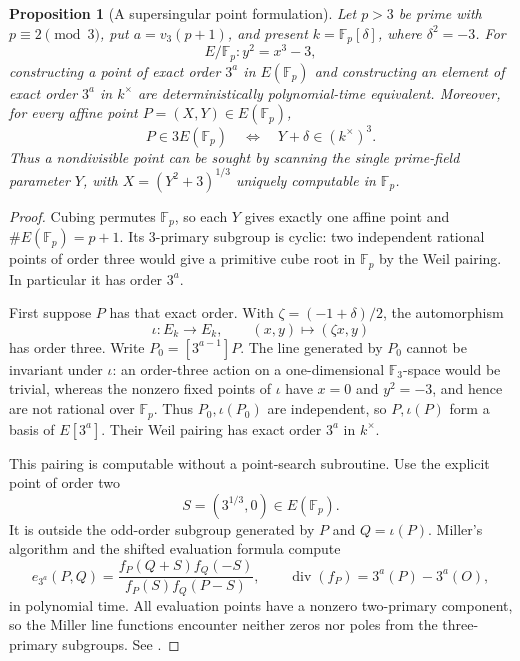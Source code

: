 \documentclass[11pt]{article}
\newtheorem{proposition}[theorem]{Proposition}
\theoremstyle{definition}
\theoremstyle{remark}
\begin{document}
\begin{proposition}[A supersingular point formulation]
\label{prop:supersingular-point-gate}
Let $p>3$ be prime with $p\equiv2\pmod3$, put
$a=v_3(p+1)$, and present
$k=\mathbb F_p[\delta]$, where $\delta^2=-3$.
For
\[
 E/\mathbb F_p:y^2=x^3-3,
\]
constructing a point of exact order $3^a$ in $E(\mathbb F_p)$
and constructing an element of exact order $3^a$ in $k^\times$
are deterministically polynomial-time equivalent.
Moreover, for every affine point $P=(X,Y)\in E(\mathbb F_p)$,
\[
 P\in3E(\mathbb F_p)
 \quad\Longleftrightarrow\quad
 Y+\delta\in(k^\times)^3.
\]
Thus a nondivisible point can be sought by scanning the single
prime-field parameter $Y$, with
$X=(Y^2+3)^{1/3}$ uniquely computable in $\mathbb F_p$.
\end{proposition}

\begin{proof}
Cubing permutes $\mathbb F_p$, so each $Y$ gives exactly one
affine point and $\#E(\mathbb F_p)=p+1$.  Its $3$-primary
subgroup is cyclic: two independent rational points of order
three would give a primitive cube root in $\mathbb F_p$ by
the Weil pairing.  In particular it has order $3^a$.

First suppose $P$ has that exact order.  With
$\zeta=(-1+\delta)/2$, the automorphism
\[
 \iota:E_k\longrightarrow E_k,
 \qquad (x,y)\longmapsto(\zeta x,y)
\]
has order three.  Write $P_0=[3^{a-1}]P$.
The line generated by $P_0$ cannot be invariant under $\iota$:
an order-three action on a one-dimensional $\mathbb F_3$-space
would be trivial, whereas the nonzero fixed points of $\iota$
have $x=0$ and $y^2=-3$, and hence are not rational over
$\mathbb F_p$.  Thus $P_0,\iota(P_0)$ are independent, so
$P,\iota(P)$ form a basis of $E[3^a]$.
Their Weil pairing has exact order $3^a$ in $k^\times$.

This pairing is computable without a point-search subroutine.
Use the explicit point of order two
\[
 S=(3^{1/3},0)\in E(\mathbb F_p).
\]
It is outside the odd-order subgroup generated by $P$ and
$Q=\iota(P)$.  Miller's algorithm and the shifted evaluation
formula compute
\[
 e_{3^a}(P,Q)
 =\frac{f_P(Q+S)f_Q(-S)}{f_P(S)f_Q(P-S)},
 \qquad
 \operatorname{div}(f_P)=3^a(P)-3^a(O),
\]
in polynomial time.  All evaluation points have a nonzero
two-primary component, so the Miller line functions encounter
neither zeros nor poles from the three-primary subgroups.
See \cite[Chapter~III, Section~8; Theorem~XI.8.1 and
Remark~XI.8.2, pp.~393--397]{Silverman2009}.


\end{proof}
\end{document}
